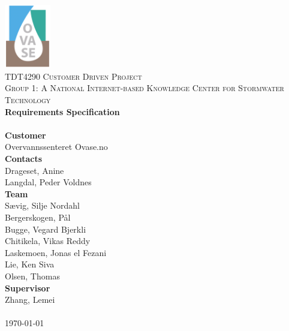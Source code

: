 \documentclass[12pt,a4paper] {report}
\begin{document}
\begin{titlepage}
	\begin{center}
		
		\includegraphics[width=0.15\textwidth]{img/wiki.png}~\\[1cm]
		
		\textsc{\LARGE TDT4290 Customer Driven Project}\\
		\textsc{\LARGE Group 1: A National Internet-based Knowledge Center for Stormwater Technology}\\[3.5cm]

		{ \huge \bfseries Requirements Specification}\\[0.5cm]
		\HRule \\[0.4cm]

		{\large \textbf{Customer}}\\
		{\large Overvannssenteret Ovase.no}\\[0.3cm]

		{\large \textbf{Contacts}}\\
		{\large Drageset, Anine}\\
		{\large Langdal, Peder Voldnes}\\[0.3cm]

		{\large \textbf{Team}}\\
		{\large S\ae vig, Silje Nordahl}\\
		{\large Bergerskogen, P\aa l}\\
		{\large Bugge, Vegard Bjerkli}\\
		{\large Chitikela, Vikas Reddy}\\
		{\large Laskemoen, Jonas el Fezani}\\
		{\large Lie, Ken Siva}\\
		{\large Olsen, Thomas}\\[0.3cm]

		{\large \textbf{Supervisor}}\\
		{\large Zhang, Lemei}\\

		\HRule \\[1.5cm]
		\vfill
		{\large \today}
		
	\end{center}
\end{titlepage}
\end{document}
